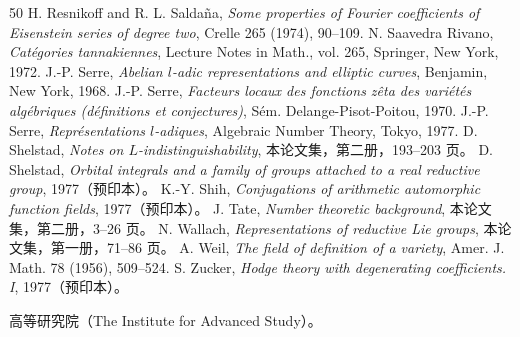 \begin{thebibliography}{50}
 H. Resnikoff and R. L. Saldaña, \textit{Some properties of Fourier coefficients of Eisenstein series of degree two}, Crelle 265 (1974), 90--109.
 N. Saavedra Rivano, \textit{Catégories tannakiennes}, Lecture Notes in Math., vol. 265, Springer, New York, 1972.
 J.-P. Serre, \textit{Abelian $l$-adic representations and elliptic curves}, Benjamin, New York, 1968.
 J.-P. Serre, \textit{Facteurs locaux des fonctions zêta des variétés algébriques (définitions et conjectures)}, Sém. Delange-Pisot-Poitou, 1970.
 J.-P. Serre, \textit{Représentations $l$-adiques}, Algebraic Number Theory, Tokyo, 1977.
 D. Shelstad, \textit{Notes on $L$-indistinguishability}, 本论文集，第二册，193--203 页。
 D. Shelstad, \textit{Orbital integrals and a family of groups attached to a real reductive group}, 1977（预印本）。
 K.-Y. Shih, \textit{Conjugations of arithmetic automorphic function fields}, 1977（预印本）。
 J. Tate, \textit{Number theoretic background}, 本论文集，第二册，3--26 页。
 N. Wallach, \textit{Representations of reductive Lie groups}, 本论文集，第一册，71--86 页。
 A. Weil, \textit{The field of definition of a variety}, Amer. J. Math. 78 (1956), 509--524.
 S. Zucker, \textit{Hodge theory with degenerating coefficients. I}, 1977（预印本）。
\end{thebibliography}
\noindent 高等研究院（The Institute for Advanced Study）。
